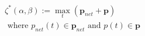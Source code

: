 \begin{equation}
\begin{split}
	\zeta^*(\alpha,\beta) := \max_t(\textbf{p}_{net} + \textbf{p})\\
	\text{ where } p_{net}(t) \in \textbf{p}_{net} \text{ and } p(t) \in \textbf{p}
\end{split}
\label{ch2:equ:dynamic-cost}
\end{equation}